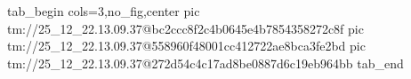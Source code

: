  
 
 
 
 

\qqSecOrig


\ifcmt
  tab_begin cols=3,no_fig,center
    pic tm://25_12_22.13.09.37@bc2ccc8f2c4b0645e4b7854358272c8f
    pic tm://25_12_22.13.09.37@558960f48001cc412722ae8bca3fe2bd
    pic tm://25_12_22.13.09.37@272d54c4c17ad8be0887d6c19eb964bb
  tab_end
\fi

